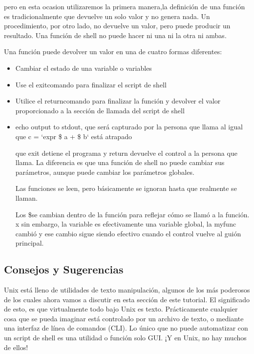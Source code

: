 \documentclass{article}
\begin{document}
\begin{itemize}
pero en esta ocasion utilizaremos la primera manera,la definición de una función es tradicionalmente que devuelve un solo valor y no genera nada. Un procedimiento, por otro lado, no devuelve un valor, pero puede producir un resultado. Una función de shell no puede hacer ni una ni la otra ni ambas.


Una función puede devolver un valor en una de cuatro formas diferentes:

 \begin{itemize}
 \item Cambiar el estado de una variable o variables
 
 \item Use el exitcomando para finalizar el script de shell
 
 \item Utilice el returncomando para finalizar la función y devolver el valor proporcionado a la sección de llamada del script de shell
 
 \item echo output to stdout, que será capturado por la persona que llama al igual que c = `expr \$ a + \$ b` está atrapado
 
 que exit detiene el programa y return devuelve el control a la persona que llama. La diferencia es que una función de shell no puede cambiar sus parámetros, aunque puede cambiar los parámetros globales.
 
 Las funciones se leen, pero básicamente se ignoran hasta que realmente se llaman.
 
 Los \$ se cambian dentro de la función para reflejar cómo se llamó a la función. x sin embargo, la variable es efectivamente una variable global, la myfunc cambió y ese cambio sigue siendo efectivo cuando el control vuelve al guión principal.
 
 
 
 
 
 \end{itemize}
 
\subsection{Consejos y Sugerencias}

Unix está lleno de utilidades de texto manipulación, algunos de los más poderosos de los cuales ahora vamos a discutir en esta sección de este tutorial. El significado de esto, es que virtualmente todo bajo Unix es texto. Prácticamente cualquier cosa que se pueda imaginar está controlado por un archivo de texto, o mediante una interfaz de línea de comandos (CLI). Lo único que no puede automatizar con un script de shell es una utilidad o función solo GUI. ¡Y en Unix, no hay muchos de ellos!


\end{itemize}
\end{document}
